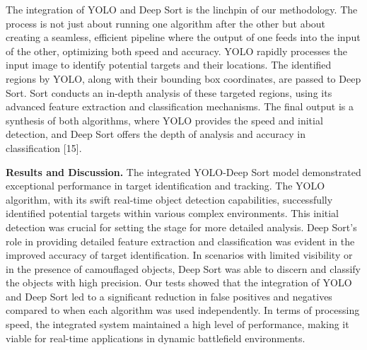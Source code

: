 The integration of YOLO and Deep Sort is the linchpin of our
methodology. The process is not just about running one algorithm after
the other but about creating a seamless, efficient pipeline where the
output of one feeds into the input of the other, optimizing both speed
and accuracy. YOLO rapidly processes the input image to identify
potential targets and their locations. The identified regions by YOLO,
along with their bounding box coordinates, are passed to Deep Sort. Sort
conducts an in-depth analysis of these targeted regions, using its
advanced feature extraction and classification mechanisms. The final
output is a synthesis of both algorithms, where YOLO provides the speed
and initial detection, and Deep Sort offers the depth of analysis and
accuracy in classification {[}15{]}.

\textbf{Results and Discussion.} The integrated YOLO-Deep Sort model
demonstrated exceptional performance in target identification and
tracking. The YOLO algorithm, with its swift real-time object detection
capabilities, successfully identified potential targets within various
complex environments. This initial detection was crucial for setting the
stage for more detailed analysis. Deep Sort's role in providing detailed
feature extraction and classification was evident in the improved
accuracy of target identification. In scenarios with limited visibility
or in the presence of camouflaged objects, Deep Sort was able to discern
and classify the objects with high precision. Our tests showed that the
integration of YOLO and Deep Sort led to a significant reduction in
false positives and negatives compared to when each algorithm was used
independently. In terms of processing speed, the integrated system
maintained a high level of performance, making it viable for real-time
applications in dynamic battlefield environments.

